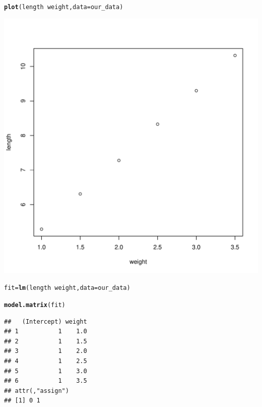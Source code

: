 \documentclass[11pt, a4paper]{article}\usepackage[]{graphicx}\usepackage[]{xcolor}
\makeatletter
\def\maxwidth{ %
  \ifdim\Gin@nat@width>\linewidth
    \linewidth
  \else
    \Gin@nat@width
  \fi
}
\newcommand{\hlopt}[1]{\textcolor[rgb]{0,0,0}{#1}}%
\newcommand{\hldef}[1]{\textcolor[rgb]{0.345,0.345,0.345}{#1}}%
\newcommand{\hlkwb}[1]{\textcolor[rgb]{0.69,0.353,0.396}{#1}}%
\newcommand{\hlkwc}[1]{\textcolor[rgb]{0.333,0.667,0.333}{#1}}%
\newcommand{\hlkwd}[1]{\textcolor[rgb]{0.737,0.353,0.396}{\textbf{#1}}}%
\newenvironment{kframe}{%
 \def\at@end@of@kframe{}%
 \ifinner\ifhmode%
  \def\at@end@of@kframe{\end{minipage}}%
  \begin{minipage}{\columnwidth}%
 \fi\fi%
 \def\FrameCommand##1{\hskip\@totalleftmargin \hskip-\fboxsep
 \colorbox{shadecolor}{##1}\hskip-\fboxsep
     \hskip-\linewidth \hskip-\@totalleftmargin \hskip\columnwidth}%
 \MakeFramed {\advance\hsize-\width
   \@totalleftmargin\z@ \linewidth\hsize
   \@setminipage}}%
 {\par\unskip\endMakeFramed%
 \at@end@of@kframe}
\newenvironment{knitrout}{}{} %
\makeatother
\begin{document}
\begin{knitrout}
\color{fgcolor}\begin{kframe}
\begin{alltt}
\hlkwd{plot}\hldef{(length} \hlopt{~} \hldef{weight,} \hlkwc{data} \hldef{= our_data)}
\end{alltt}
\end{kframe}
\includegraphics[width=\maxwidth]{figure/unnamed-chunk-2-1} 
\end{knitrout}

\begin{knitrout}
\color{fgcolor}\begin{kframe}
\begin{alltt}
\hldef{fit} \hlkwb{=} \hlkwd{lm}\hldef{(length} \hlopt{~} \hldef{weight,} \hlkwc{data} \hldef{= our_data)}
\end{alltt}
\end{kframe}
\end{knitrout}

\begin{knitrout}
\color{fgcolor}\begin{kframe}
\begin{alltt}
\hlkwd{model.matrix}\hldef{(fit)}
\end{alltt}
\begin{verbatim}
##   (Intercept) weight
## 1           1    1.0
## 2           1    1.5
## 3           1    2.0
## 4           1    2.5
## 5           1    3.0
## 6           1    3.5
## attr(,"assign")
## [1] 0 1
\end{verbatim}
\end{kframe}
\end{knitrout}
\end{document}
